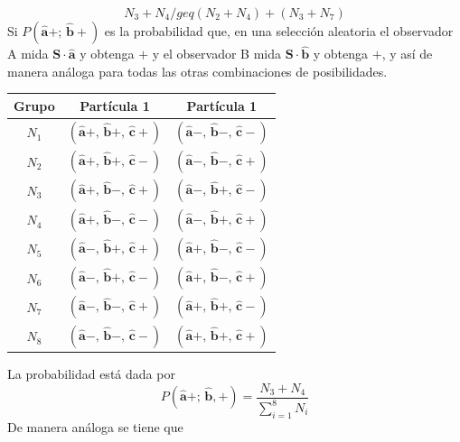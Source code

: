 \documentclass[a4paper]{article}
\begin{document}
\begin{equation}\label{eq::positivity_condition}
N_3 + N_4 /geq (N_2 +  N_4) + (N_3 +  N_7)
\end{equation} 
Si $P(\mathbf{\hat{a}}+;\,\mathbf{\hat{b}}+)$ es la probabilidad que, en una selección aleatoria el observador A mida $\mathbf{S}\cdot \mathbf{\hat{a}}$ y obtenga $+$ y el observador B mida $\mathbf{S}\cdot \mathbf{\hat{b}}$ y obtenga $+$, y así de manera análoga para todas las otras combinaciones de posibilidades.	
\begin{table}
\centering
\begin{tabular}{|c|c|c|}
\hline
\toprule
\textbf{Grupo} & \textbf{Partícula 1} & \textbf{Partícula 1} \\
\midrule
$N_1$ & $(\mathbf{\hat{a}}+,\, \mathbf{\hat{b}}+,\,\mathbf{\hat{c}}+)$ & $(\mathbf{\hat{a}}-,\, \mathbf{\hat{b}}-,\,\mathbf{\hat{c}}-)$\\
$N_2$ & $(\mathbf{\hat{a}}+,\, \mathbf{\hat{b}}+,\,\mathbf{\hat{c}}-)$ & $(\mathbf{\hat{a}}-,\, \mathbf{\hat{b}}-,\,\mathbf{\hat{c}}+)$\\
$N_3$ & $(\mathbf{\hat{a}}+,\, \mathbf{\hat{b}}-,\,\mathbf{\hat{c}}+)$ & $(\mathbf{\hat{a}}-,\, \mathbf{\hat{b}}+,\,\mathbf{\hat{c}}-)$\\
$N_4$ & $(\mathbf{\hat{a}}+,\, \mathbf{\hat{b}}-,\,\mathbf{\hat{c}}-)$ & $(\mathbf{\hat{a}}-,\, \mathbf{\hat{b}}+,\,\mathbf{\hat{c}}+)$\\
$N_5$ & $(\mathbf{\hat{a}}-,\, \mathbf{\hat{b}}+,\,\mathbf{\hat{c}}+)$ & $(\mathbf{\hat{a}}+,\, \mathbf{\hat{b}}-,\,\mathbf{\hat{c}}-)$\\
$N_6$ & $(\mathbf{\hat{a}}-,\, \mathbf{\hat{b}}+,\,\mathbf{\hat{c}}-)$ & $(\mathbf{\hat{a}}+,\, \mathbf{\hat{b}}-,\,\mathbf{\hat{c}}+)$\\
$N_7$ & $(\mathbf{\hat{a}}-,\, \mathbf{\hat{b}}-,\,\mathbf{\hat{c}}+)$ & $(\mathbf{\hat{a}}+,\, \mathbf{\hat{b}}+,\,\mathbf{\hat{c}}-)$\\
$N_8$ & $(\mathbf{\hat{a}}-,\, \mathbf{\hat{b}}-,\,\mathbf{\hat{c}}-)$ & $(\mathbf{\hat{a}}+,\, \mathbf{\hat{b}}+,\,\mathbf{\hat{c}}+)$\\
\bottomrule
\hline
\end{tabular}
    \label{tab:three_direction_correlations}
\end{table}
La probabilidad está dada por 
\begin{equation}
P(\mathbf{\hat{a}}+;\, \mathbf{\hat{b}},+) = \frac{N_3+N_4}{\sum_{i=1}^{8} N_i} 
\end{equation}
De manera análoga se tiene que 
\end{document}
